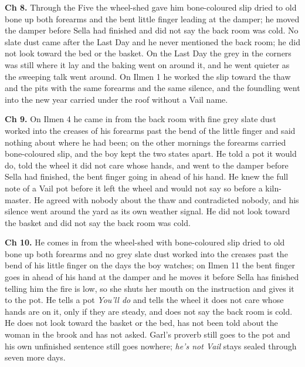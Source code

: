 \documentclass{design/chronicle}
\begin{document}
{\textbf{Ch 8.} Through the Five the wheel-shed gave him bone-coloured slip dried to old bone up both forearms and the bent little finger leading at the damper; he moved the damper before Sella had finished and did not say the back room was cold. No slate dust came after the Last Day and he never mentioned the back room; he did not look toward the bed or the basket. On the Last Day the grey in the corners was still where it lay and the baking went on around it, and he went quieter as the sweeping talk went around. On Ilmen 1 he worked the slip toward the thaw and the pits with the same forearms and the same silence, and the foundling went into the new year carried under the roof without a Vail name.

\textbf{Ch 9.} On Ilmen 4 he came in from the back room with fine grey slate dust worked into the creases of his forearms past the bend of the little finger and said nothing about where he had been; on the other mornings the forearms carried bone-coloured slip, and the boy kept the two states apart. He told a pot it would do, told the wheel it did not care whose hands, and went to the damper before Sella had finished, the bent finger going in ahead of his hand. He knew the full note of a Vail pot before it left the wheel and would not say so before a kiln-master. He agreed with nobody about the thaw and contradicted nobody, and his silence went around the yard as its own weather signal. He did not look toward the basket and did not say the back room was cold.

\textbf{Ch 10.} He comes in from the wheel-shed with bone-coloured slip dried to old bone up both forearms and no grey slate dust worked into the creases past the bend of his little finger on the days the boy watches; on Ilmen 11 the bent finger goes in ahead of his hand at the damper and he moves it before Sella has finished telling him the fire is low, so she shuts her mouth on the instruction and gives it to the pot. He tells a pot \emph{You’ll do} and tells the wheel it does not care whose hands are on it, only if they are steady, and does not say the back room is cold. He does not look toward the basket or the bed, has not been told about the woman in the brook and has not asked. Garl’s proverb still goes to the pot and his own unfinished sentence still goes nowhere; \emph{he’s not Vail} stays sealed through seven more days.

}
\end{document}
